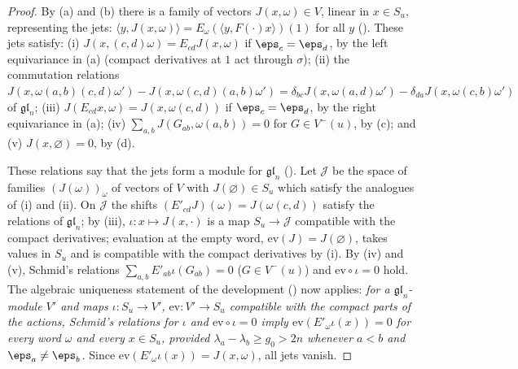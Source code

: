 \begin{proof}
By (a) and (b) there is a family of vectors $J(x,\omega)\in V$, linear in $x\in S_u$, representing the jets:
$\langle y,J(x,\omega)\rangle=E_\omega(\langle y,F(\cdot)x\rangle)(1)$ for all $y$
(). These jets satisfy: (i) $J(x,(c,d)\omega)=E_{cd}J(x,\omega)$ if $\eps_c=\eps_d$,
by the left equivariance in (a) (compact derivatives at $1$ act through $\sigma$); (ii) the commutation relations
$J(x,\omega(a,b)(c,d)\omega')-J(x,\omega(c,d)(a,b)\omega')=\delta_{bc}J(x,\omega(a,d)\omega')-\delta_{da}J(x,\omega(c,b)\omega')$ of
$\mathfrak{gl}_n$; (iii) $J(E_{cd}x,\omega)=J(x,\omega(c,d))$ if $\eps_c=\eps_d$, by the right equivariance in (a); (iv)
$\sum_{a,b}J(G_{ab},\omega(a,b))=0$ for $G\in V^-(u)$, by (c); and (v) $J(x,\varnothing)=0$, by (d).

These relations say that the jets form a module for $\mathfrak{gl}_n$ (). Let
$\mathcal J$ be the space of families $(J(\omega))_\omega$ of vectors of $V$ with $J(\varnothing)\in S_u$ which satisfy the analogues of
(i) and (ii). On $\mathcal J$ the shifts $(E'_{cd}J)(\omega)=J(\omega(c,d))$ satisfy the relations of $\mathfrak{gl}_n$; by (iii),
$\iota\colon x\mapsto J(x,\cdot)$ is a map $S_u\to\mathcal J$ compatible with the compact derivatives; evaluation at the empty word,
$\mathrm{ev}(J)=J(\varnothing)$, takes values in $S_u$ and is compatible with the compact derivatives by (i). By (iv)
and (v), Schmid's relations $\sum_{a,b}E'_{ab}\iota(G_{ab})=0$ ($G\in V^-(u)$) and $\mathrm{ev}\circ\iota=0$ hold. The algebraic uniqueness
statement of the development () now applies: \emph{for a $\mathfrak{gl}_n$-module $V'$
and maps $\iota\colon S_u\to V'$, $\mathrm{ev}\colon V'\to S_u$ compatible with the compact parts of the actions, Schmid's relations for
$\iota$ and $\mathrm{ev}\circ\iota=0$ imply $\mathrm{ev}(E'_\omega\iota(x))=0$ for every word $\omega$ and every $x\in S_u$, provided
$\lambda_a-\lambda_b\ge g_0>2n$ whenever $a<b$ and $\eps_a\ne\eps_b$.} Since $\mathrm{ev}(E'_\omega\iota(x))=J(x,\omega)$, all jets vanish.
\end{proof}

